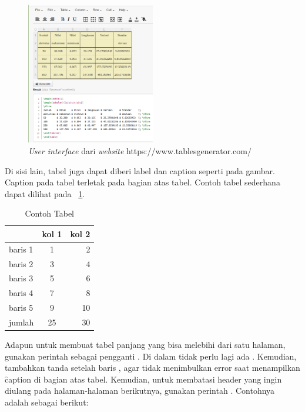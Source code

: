 \begin{figure}
	\centering
	\includegraphics[width=0.5\textwidth]{assets/pics/tablesgenerator-dot-com.png}
	\caption{\textit{User interface} dari \textit{website} https://www.tablesgenerator.com/}
	\label{fig:tablesgenerator}
\end{figure}

Di sisi lain, tabel juga dapat diberi label dan caption seperti pada gambar.
Caption pada tabel terletak pada bagian atas tabel.
Contoh tabel sederhana dapat dilihat pada \tab~\ref{tab:tab1}.

\begin{table}
	\centering
	\caption{Contoh Tabel}
	\label{tab:tab1}
	\begin{tabular}{| l | c r |}
		\hline
		& kol 1 & kol 2 \\
		\hline
		baris 1 & 1 & 2 \\
		baris 2 & 3 & 4 \\
		baris 3 & 5 & 6 \\
		baris 4 & 7 & 8 \\
		baris 5 & 9 & 10 \\
		\hline
		jumlah  & 25 & 30 \\
		\hline
	\end{tabular}
\end{table}

Adapun untuk membuat tabel panjang yang bisa melebihi dari satu halaman, gunakan perintah  sebagai pengganti . Di dalam  tidak perlu lagi ada . Kemudian, tambahkan tanda \code{\bslash{}\bslash{}} setelah baris , agar tidak menimbulkan error saat menampilkan \f{caption} di bagian atas tabel. Kemudian, untuk membatasi header yang ingin diulang pada halaman-halaman berikutnya, gunakan perintah . Contohnya adalah sebagai berikut:

